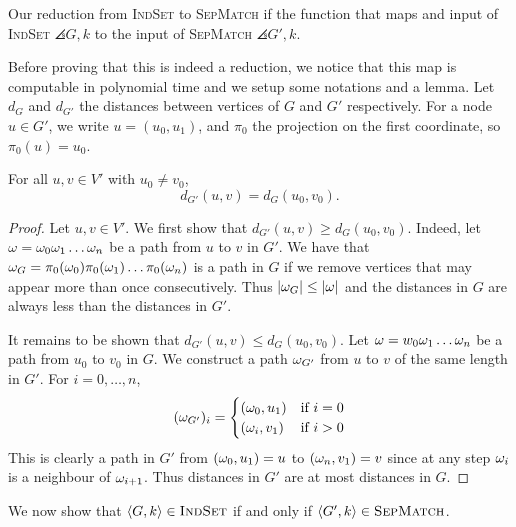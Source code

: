     Our reduction from \textsc{IndSet} to \textsc{SepMatch}
    if the function that maps and input of \textsc{IndSet}
    $\angles{G, k}$ to the input of \textsc{SepMatch} $\angles{G', k}$.

    Before proving that this is indeed a reduction, we notice that this map 
    is computable in polynomial time and we setup some notations and a lemma.
    Let $d_G$ and $d_{G'}$ the distances between vertices of $G$ and $G'$
    respectively. For a node $u \in G'$, we write $u = (u_0, u_1)$,
    and $\pi_0$ the projection on the first coordinate, so $\pi_0(u) = u_0$.

    \begin{lemma*}
        For all $u, v \in V'$ with $u_0 \neq v_0$, \[
            d_{G'}(u, v) = d_G(u_0, v_0).
        \]
    \end{lemma*}
    \begin{proof}
        Let $u, v \in V'$. We first show that $d_{G'}(u, v) \geq d_G(u_0, v_0)$.
        Indeed, let $\omega = \omega_0\omega_1\dots\omega_n$ be a path from $u$ to $v$ in $G'$. 
        We have that $\omega_G = \pi_0(\omega_0) \pi_0(\omega_1) \dots \pi_0(\omega_n)$
        is a path in $G$ if we remove vertices that may appear more than once consecutively.
        Thus $\left| \omega_G \right| \leq \left| \omega \right|$ and the distances in $G$ are always 
        less than the distances in $G'$.

        It remains to be shown that $d_{G'}(u, v) \leq d_G(u_0, v_0)$.
        Let $\omega = w_0\omega_1\dots\omega_n$  be a path from $u_0$ to $v_0$ in $G$. We
        construct a path $\omega_{G'}$ from $u$ to $v$ of the same length 
        in $G'$. For $i = 0, \dots, n$,
        \[ 
            (\omega_{G'})_i = \begin{cases}
                (\omega_0, u_1) & \text{if } i = 0 \\
                (\omega_i, v_1) & \text{if } i > 0
            \end{cases}
        \]
        This is clearly a path in $G'$ from $(\omega_0, u_1) = u$ to $(\omega_n, v_1) = v$
        since at any step $\omega_i$ is a neighbour of $\omega_{i+1}$.
        Thus distances in $G'$ are at most distances in $G$.
    \end{proof}

    We now show that $\left\langle G, k \right\rangle \in \textsc{IndSet}$ if and only if 
    $\left\langle G', k \right\rangle \in \textsc{SepMatch}$.
    
